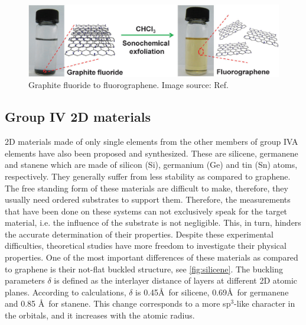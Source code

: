 \begin{figure}[htbp!] 
\centering  
\includegraphics[width=1\textwidth]{fluorographene.png}
\caption[Graphite fluoride to fluorographene]{Graphite fluoride to fluorographene. Image source: Ref. \cite{Zhu2013}}  
\label{fig:gra_f}
\end{figure} 

\subsection{Group IV 2D materials}

2D materials made of only single elements from the other members of group IVA elements have also been proposed and synthesized. These are silicene, germanene and stanene which are made of silicon (Si), germanium (Ge) and tin (Sn) atoms, respectively. They generally suffer from less stability as compared to graphene. The free standing form of these materials are difficult to make, therefore, they usually need ordered substrates to support them. Therefore, the measurements that have been done on these systems can not exclusively speak for the target material, i.e. the influence of the substrate is not negligible\cite{Lin2013}. This, in turn, hinders the accurate determination of their properties. Despite these experimental difficulties, theoretical studies have more freedom to investigate their physical properties. One of the most important differences of these materials as compared to graphene is their not-flat buckled structure, see \autoref{fig:silicene}. The buckling parameters $\delta$ is defined as the interlayer distance of layers at different 2D atomic planes. According to calculations, $\delta$ is 0.45\AA~for silicene, 0.69\AA~for germanene and 0.85 \AA~for stanene\cite{matthes2013}. This change corresponds to a more sp$^3$-like character in the orbitals, and it increases with the atomic radius. 

